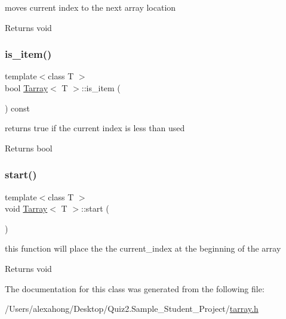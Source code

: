 moves current index to the next array location 

\begin{DoxyReturn}{Returns}
void 
\end{DoxyReturn}
\mbox{\label{class_tarray_ab4047d306cc681cee5b665f0cca887f1}} 
\subsubsection{\texorpdfstring{is\+\_\+item()}{is\_item()}}
{\footnotesize\ttfamily template$<$class T $>$ \\
bool \hyperlink{class_tarray}{Tarray}$<$ T $>$\+::is\+\_\+item (\begin{DoxyParamCaption}{ }\end{DoxyParamCaption}) const}



returns true if the current index is less than used 

\begin{DoxyReturn}{Returns}
bool 
\end{DoxyReturn}
\mbox{\label{class_tarray_afdf48d2a03b6b1c110818998b6a86a38}} 
\subsubsection{\texorpdfstring{start()}{start()}}
{\footnotesize\ttfamily template$<$class T $>$ \\
void \hyperlink{class_tarray}{Tarray}$<$ T $>$\+::start (\begin{DoxyParamCaption}{ }\end{DoxyParamCaption})}



this function will place the the current\+\_\+index at the beginning of the array 

\begin{DoxyReturn}{Returns}
void 
\end{DoxyReturn}


The documentation for this class was generated from the following file\+:\begin{DoxyCompactItemize}
\item 
/\+Users/alexahong/\+Desktop/\+Quiz2.\+Sample\+\_\+\+Student\+\_\+\+Project/\hyperlink{tarray_8h}{tarray.\+h}\end{DoxyCompactItemize}
